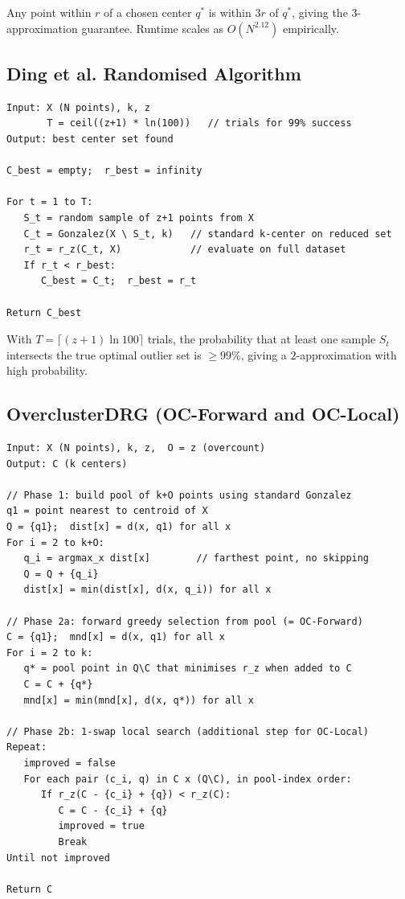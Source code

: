 \documentclass[11pt]{article}
\begin{document}
Any point within $r$ of a chosen center $q^*$ is within $3r$ of $q^*$, giving the $3$-approximation guarantee. Runtime scales as $O(N^{2.12})$ empirically.

\subsection{Ding et al. Randomised Algorithm}

\begin{verbatim}
Input: X (N points), k, z
       T = ceil((z+1) * ln(100))   // trials for 99% success
Output: best center set found

C_best = empty;  r_best = infinity

For t = 1 to T:
   S_t = random sample of z+1 points from X
   C_t = Gonzalez(X \ S_t, k)   // standard k-center on reduced set
   r_t = r_z(C_t, X)            // evaluate on full dataset
   If r_t < r_best:
      C_best = C_t;  r_best = r_t

Return C_best
\end{verbatim}

With $T = \lceil(z{+}1)\ln 100\rceil$ trials, the probability that at least one sample $S_t$ intersects the true optimal outlier set is $\ge 99\%$, giving a $2$-approximation with high probability.

\subsection{OverclusterDRG (OC-Forward and OC-Local)}

\begin{verbatim}
Input: X (N points), k, z,  O = z (overcount)
Output: C (k centers)

// Phase 1: build pool of k+O points using standard Gonzalez
q1 = point nearest to centroid of X
Q = {q1};  dist[x] = d(x, q1) for all x
For i = 2 to k+O:
   q_i = argmax_x dist[x]        // farthest point, no skipping
   Q = Q + {q_i}
   dist[x] = min(dist[x], d(x, q_i)) for all x

// Phase 2a: forward greedy selection from pool (= OC-Forward)
C = {q1};  mnd[x] = d(x, q1) for all x
For i = 2 to k:
   q* = pool point in Q\C that minimises r_z when added to C
   C = C + {q*}
   mnd[x] = min(mnd[x], d(x, q*)) for all x

// Phase 2b: 1-swap local search (additional step for OC-Local)
Repeat:
   improved = false
   For each pair (c_i, q) in C x (Q\C), in pool-index order:
      If r_z(C - {c_i} + {q}) < r_z(C):
         C = C - {c_i} + {q}
         improved = true
         Break
Until not improved

Return C
\end{verbatim}
\end{document}
